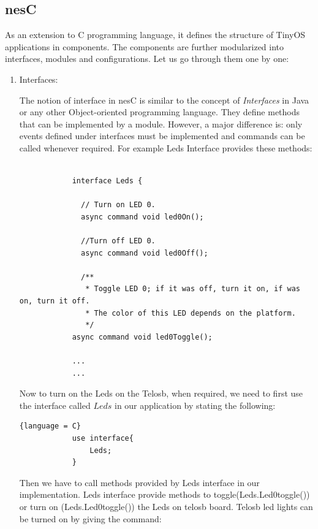     \subsection*{nesC}
    
    As an extension to C programming language, it defines the structure of TinyOS applications in components. The components are further modularized into interfaces, modules and configurations. Let us go through them one by one:
    
    \begin{enumerate}
        \item Interfaces:
        
        The notion of interface in nesC is similar to the concept of \textit{Interfaces} in Java or any other Object-oriented programming language. They define methods that can be implemented by a module. However, a major difference is: only events defined under interfaces must be implemented and commands can be called whenever required. For example Leds Interface provides these methods:
        
        \begin{lstlisting}
        
            interface Leds {
            
              // Turn on LED 0.
              async command void led0On();
            
              //Turn off LED 0.
              async command void led0Off();
            
              /**
               * Toggle LED 0; if it was off, turn it on, if was on, turn it off.
               * The color of this LED depends on the platform.
               */
            async command void led0Toggle();
            
            ...
            ...
        \end{lstlisting}
        
        Now to turn on the Leds on the Telosb, when required, we need to first use the interface called $Leds$ in our application by stating the following:
        
        \begin{lstlisting}{language = C}
            use interface{
                Leds;
            }
        \end{lstlisting}
        
        Then we have to call methods provided by Leds interface in our implementation. Leds interface provide methods to toggle(Leds.Led0toggle()) or turn on (Leds.Led0toggle()) the Leds on telosb board. Telosb led lights can be turned on by giving the command: 
        

\end{enumerate}
